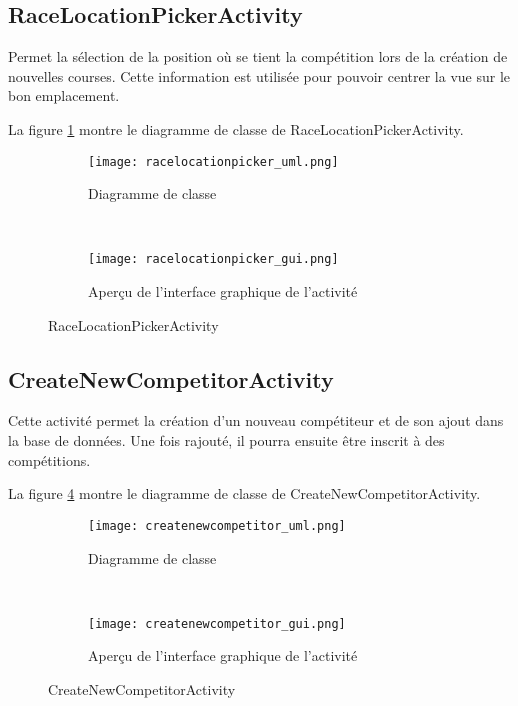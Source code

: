 \subsection{RaceLocationPickerActivity}

Permet la sélection de la position où se tient la compétition lors de la création de nouvelles courses. Cette information est utilisée pour pouvoir centrer la vue sur le bon emplacement.

La figure \ref{fig:racelocationpicker_uml} montre le diagramme de classe de RaceLocationPickerActivity.

\begin{figure}[htb!]
    \centering
    \begin{subfigure}[htb]{0.49\textwidth}
		\texttt{[image: racelocationpicker\_uml.png]} 
		\caption{Diagramme de classe}
		\label{fig:racelocationpicker_uml}
    \end{subfigure}
    ~ %
    \begin{subfigure}[htb]{0.49\textwidth}
		\texttt{[image: racelocationpicker\_gui.png]} 
		\caption{Aperçu de l'interface graphique de l'activité}
		\label{fig:racelocationpicker_gui}
    \end{subfigure}
    \caption{RaceLocationPickerActivity}\label{fig:racelocationpicker_fig}
\end{figure}

\subsection{CreateNewCompetitorActivity}

Cette activité permet la création d'un nouveau compétiteur et de son ajout dans la base de données. Une fois rajouté, il pourra ensuite être inscrit à des compétitions.

La figure \ref{fig:createnewcompetitor_uml} montre le diagramme de classe de CreateNewCompetitorActivity.

\begin{figure}[htb!]
    \centering
    \begin{subfigure}[htb]{0.49\textwidth}
		\texttt{[image: createnewcompetitor\_uml.png]} 
		\caption{Diagramme de classe}
		\label{fig:createnewcompetitor_uml}
    \end{subfigure}
    ~ %
    \begin{subfigure}[htb]{0.49\textwidth}
		\texttt{[image: createnewcompetitor\_gui.png]} 
		\caption{Aperçu de l'interface graphique de l'activité}
		\label{fig:createnewcompetitor_gui}
    \end{subfigure}
    \caption{CreateNewCompetitorActivity}\label{fig:createnewcompetitor_fig}
\end{figure}

